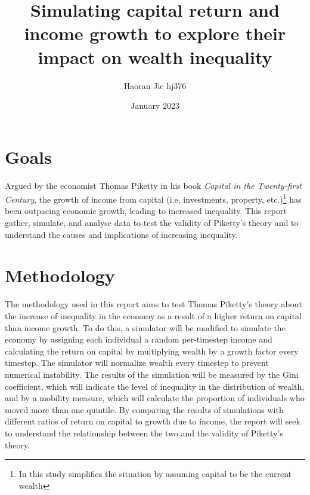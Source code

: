 \documentclass{article}
\title{Simulating capital return and income growth to explore their impact on wealth inequality
}
\author{Haoran Jie hj376}
\date{January 2023}
\begin{document}
\maketitle


\section*{Goals}
Argued by the economist Thomas Piketty in his book \textit{Capital in the Twenty-first Century}, the growth of income from capital (i.e. investments, property, etc.)\footnote{In this study simplifies the situation by assuming capital to be the current wealth} has been outpacing economic growth, leading to increased inequality. This report gather, simulate, and analyse data to test the validity of Piketty's theory and to understand the causes and implications of increasing inequality.
\vspace{-0.4cm}
\section*{Methodology}
\vspace{-0.3cm}
The methodology used in this report aims to test Thomas Piketty's theory about the increase of inequality in the economy as a 
result of a higher return on capital than income growth. To do this, a simulator will be modified to simulate the economy by 
assigning each individual a random per-timestep income and calculating the return on capital by multiplying wealth by a growth 
factor every timestep. The simulator will normalize wealth every timestep to prevent numerical instability. The results of the 
simulation will be measured by the Gini coefficient, which will indicate the level of inequality in the distribution of wealth,
 and by a mobility measure, which will calculate the proportion of individuals who moved more than one quintile. By comparing 
 the results of simulations with different ratios of return on capital to growth due to income, the report will seek to 
 understand the relationship between the two and the validity of Piketty's theory.


\vspace{-0.4cm}



\end{document}
